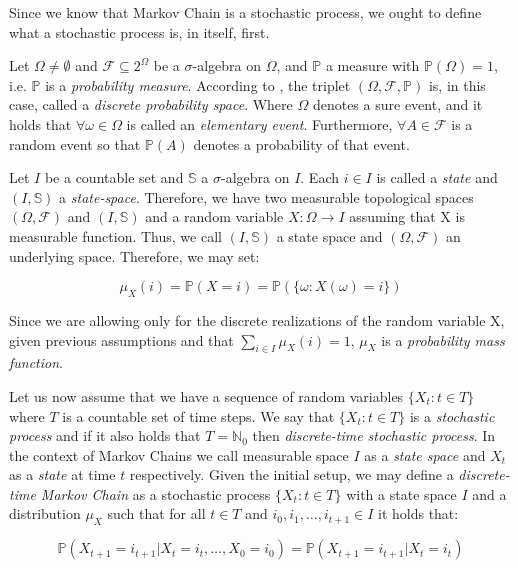 Since we know that Markov Chain is a stochastic process, we ought to define what a stochastic process is, in itself, first. 

Let $\Omega \neq \emptyset$ and $\mathcal{F} \subseteq 2^{\Omega}$ be a $\sigma$-algebra on $\Omega$, and $\mathbb{P}$ a measure with $\mathbb{P}(\Omega) = 1$, i.e. $\mathbb{P}$ is a \textit{probability measure}. According to \cite{Dostal}, the triplet $(\Omega, \mathcal{F}, \mathbb{P})$ is, in this case, called a \textit{discrete probability space}. Where $\Omega$ denotes a sure event, and it holds that $\forall \omega \in \Omega$ is called an \textit{elementary event}. Furthermore, $\forall A \in \mathcal{F}$ is a random event  so that $\mathbb{P}(A)$ denotes a probability of that event. 

Let $I$ be a countable set and $\mathbb{S}$ a $\sigma$-algebra on $I$. Each $i \in I$ is called a \textit{state} and $(I,\mathbb{S})$ a \textit{state-space}.
Therefore, we have two measurable topological spaces $(\Omega,\mathcal{F})$ and $(I,\mathbb{S})$ and a random variable $X: \Omega \rightarrow I$ assuming that X is measurable function. Thus, we call $(I,\mathbb{S})$ a state space and $(\Omega, \mathcal{F})$ an underlying space. Therefore, we may set:

\begin{equation}
\mu_X(i) = \mathbb{P}(X=i)=\mathbb{P}(\{\omega: X(\omega)=i\})
\end{equation}

Since we are allowing only for the discrete realizations of the random variable X, given previous assumptions and that $\sum\limits_{i \in I} \mu_X(i)=1$, $\mu_X$ is a \textit{probability mass function}. \cite{Norris2012}

Let us now assume that we have a sequence of random variables $\{X_t : t \in T\}$ where $T$ is a countable set of time steps.
 We say that $\{X_t : t \in T\}$ is a \textit{stochastic process} and if it also holds that $T = \mathbb{N}_0$ then {\it discrete-time stochastic process}.
 In the context of Markov Chains we call measurable space $I$ as a \textit{state space} and $X_t$ as a \textit{state} at time $t$ respectively.
 Given the initial setup, we may define a \textit{discrete-time Markov Chain} as a stochastic process $\{X_t : t \in T\}$ with a state space $I$ and a distribution $\mu_X$ such that for all $t \in T$ and $i_0,i_1,\ldots,i_{t+1} \in I$ it holds that:

\begin{equation} \label{eq:DTMC}
\mathbb{P}(X_{t+1}=i_{t+1}|X_t=i_t,\ldots,X_0=i_0) = \mathbb{P}(X_{t+1}=i_{t+1}|X_t=i_t)
\end{equation}

